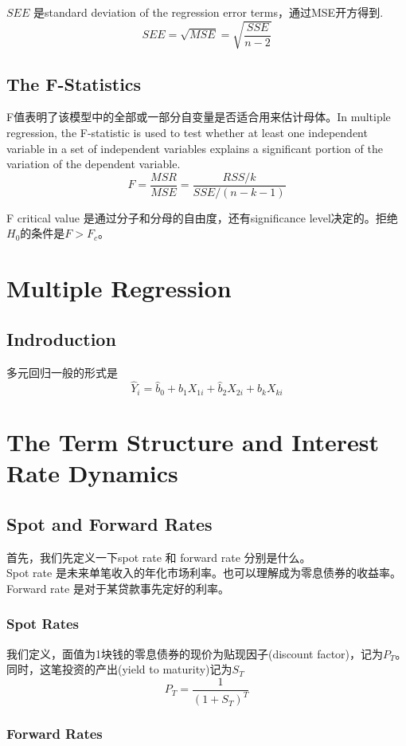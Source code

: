 \documentclass[cn,11pt,chinese]{elegantbook}
\begin{document}
    \(SEE\) 是standard deviation of the regression error terms，通过MSE开方得到.
    \[SEE = \sqrt{MSE} = \sqrt{\frac{SSE}{n - 2}}\]

\section{The F-Statistics}
    F值表明了该模型中的全部或一部分自变量是否适合用来估计母体。In multiple regression, the F-statistic is used to test whether at least one independent variable in a set of independent variables explains a significant portion of the variation of the dependent variable.
    \[F = \frac{MSR}{MSE} = \frac{RSS / k}{SSE / (n - k - 1)}\]

    F critical value 是通过分子和分母的自由度，还有significance level决定的。拒绝\(H_0\)的条件是\(F > F_c\)。

\chapter{Multiple Regression}
\section{Indroduction}
    多元回归一般的形式是 \[\hat Y_i = \hat b_0 + \hat b_1 X_{1i} + \hat b_2 X_{2i} + \hat b_k X_{ki}\]

\chapter{The Term Structure and Interest Rate Dynamics}
\section{Spot and Forward Rates}
    首先，我们先定义一下spot rate 和 forward rate 分别是什么。\\
    Spot rate 是未来单笔收入的年化市场利率。也可以理解成为零息债券的收益率。\\
    Forward rate 是对于某贷款事先定好的利率。

    \subsection{Spot Rates}
        我们定义，面值为1块钱的零息债券的现价为贴现因子(discount factor)，记为\(P_T\)。同时，这笔投资的产出(yield to maturity)记为\(S_T\)
            \[P_T = \frac{1}{(1 + S_T)^T}\]
    
    \subsection{Forward Rates}
        
\end{document}
